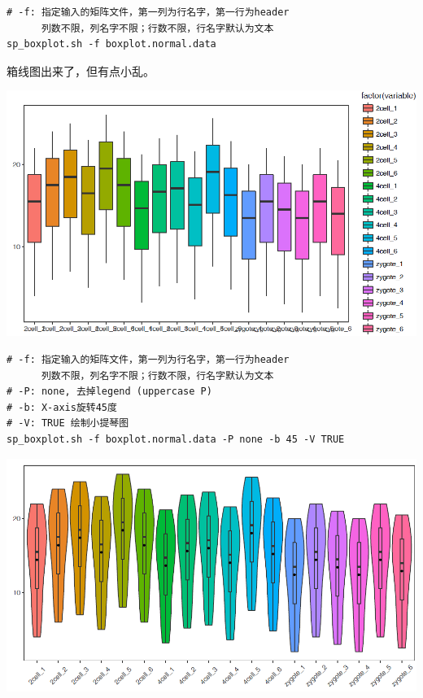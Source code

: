 \documentclass[]{article}
\numberwithin{figure}{section}
\numberwithin{table}{section}
\theoremstyle{definition}
\theoremstyle{definition}
\theoremstyle{definition}
\theoremstyle{remark}
\begin{document}
\begin{verbatim}
# -f: 指定输入的矩阵文件，第一列为行名字，第一行为header
      列数不限，列名字不限；行数不限，行名字默认为文本
sp_boxplot.sh -f boxplot.normal.data
\end{verbatim}

箱线图出来了，但有点小乱。

\begin{center}\includegraphics[width=0.95\linewidth,height=0.7\textheight,keepaspectratio]{images/boxplot_6} \end{center}

\begin{verbatim}
# -f: 指定输入的矩阵文件，第一列为行名字，第一行为header
      列数不限，列名字不限；行数不限，行名字默认为文本
# -P: none, 去掉legend (uppercase P)
# -b: X-axis旋转45度
# -V: TRUE 绘制小提琴图
sp_boxplot.sh -f boxplot.normal.data -P none -b 45 -V TRUE
\end{verbatim}

\begin{center}\includegraphics[width=0.95\linewidth,height=0.7\textheight,keepaspectratio]{images/boxplot_7} \end{center}
\end{document}
